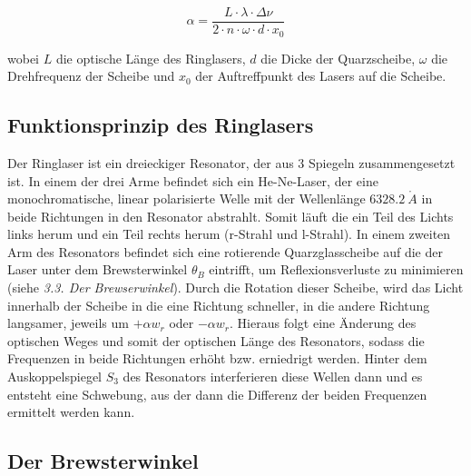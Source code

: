 \begin{equation} \alpha = \frac{L\cdot\lambda\cdot\Delta\nu}{2\cdot n\cdot\omega\cdot d \cdot x_0} \end{equation}

wobei $L$ die optische Länge des Ringlasers, $d$ die Dicke der Quarzscheibe, $\omega$ die Drehfrequenz der Scheibe und $x_0$ der Auftreffpunkt des Lasers auf die Scheibe.


\subsection{Funktionsprinzip des Ringlasers}

Der Ringlaser ist ein dreieckiger Resonator, der aus 3 Spiegeln zusammengesetzt ist. In einem der drei Arme befindet sich ein He-Ne-Laser, der eine monochromatische, linear polarisierte Welle mit der Wellenlänge $6328.2 \ \mathring A$ in beide Richtungen in den Resonator abstrahlt. Somit läuft die ein Teil des Lichts links herum und ein Teil rechts herum (r-Strahl und l-Strahl). In einem zweiten Arm des Resonators befindet sich eine rotierende Quarzglasscheibe auf die der Laser unter dem Brewsterwinkel $\theta_B$ eintrifft, um Reflexionsverluste zu minimieren (siehe \emph{3.3. Der Brewserwinkel}). Durch die Rotation dieser Scheibe, wird das Licht innerhalb der Scheibe in die eine Richtung schneller, in die andere Richtung langsamer, jeweils um $+\alpha w_r$ oder $-\alpha w_r$. Hieraus folgt eine Änderung des optischen Weges und somit der optischen Länge des Resonators, sodass die Frequenzen in beide Richtungen erhöht bzw. erniedrigt werden. Hinter dem Auskoppelspiegel $S_3$ des Resonators interferieren diese Wellen dann und es entsteht eine Schwebung, aus der dann die Differenz der beiden Frequenzen ermittelt werden kann.


\subsection{Der Brewsterwinkel}





























